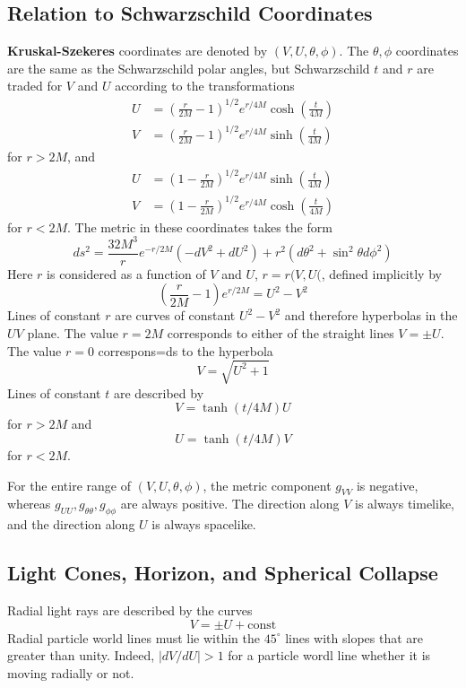 \subsection{Relation to Schwarzschild Coordinates}

\textbf{Kruskal-Szekeres} coordinates are denoted by $(V,U,\theta,\phi)$. The $\theta,\phi$ coordinates are the same as the Schwarzschild polar angles, but Schwarzschild $t$ and $r$ are traded for $V$ and $U$ according to the transformations \begin{align*}
    U &= \left(\frac{r}{2M}-1\right)^{1/2}e^{r/4M}\cosh\left(\frac{t}{4M}\right) \\
    V &= \left(\frac{r}{2M}-1\right)^{1/2}e^{r/4M}\sinh\left(\frac{t}{4M}\right)
\end{align*}
for $r > 2M$, and \begin{align*}
    U &= \left(1-\frac{r}{2M}\right)^{1/2}e^{r/4M}\sinh\left(\frac{t}{4M}\right) \\
    V &= \left(1-\frac{r}{2M}\right)^{1/2}e^{r/4M}\cosh\left(\frac{t}{4M}\right)
\end{align*}
for $r < 2M$. The metric in these coordinates takes the form \begin{equation*}
    \boxed{ds^2 = \frac{32M^3}{r}e^{-r/2M}\left(-dV^2+dU^2\right)+r^2\left(d\theta^2+\sin^2\theta d\phi^2\right)}
\end{equation*}
Here $r$ is considered as a function of $V$ and $U$, $r = r(V,U($, defined implicitly by $$\left(\frac{r}{2M}-1\right)e^{r/2M} = U^2-V^2$$
Lines of constant $r$ are curves of constant $U^2-V^2$ and therefore hyperbolas in the $UV$ plane. The value $r = 2M$ corresponds to either of the straight lines $V = \pm U$. The value $r = 0$ correspons=ds to the hyperbola $$V = \sqrt{U^2+1}$$
Lines of constant $t$ are described by $$V = \tanh(t/4M)U$$ 
for $r > 2M$ and $$U = \tanh(t/4M)V$$
for $r < 2M$.

For the entire range of $(V,U,\theta,\phi)$, the metric component $g_{VV}$ is negative, whereas $g_{UU}, g_{\theta\theta},g_{\phi\phi}$ are always positive. The direction along $V$ is always timelike, and the direction along $U$ is always spacelike.              

\subsection{Light Cones, Horizon, and Spherical Collapse}

Radial light rays are described by the curves $$V = \pm U+\text{const}$$
Radial particle world lines must lie within the $45^{\circ}$ lines with slopes that are greater than unity. Indeed, $|dV/dU| > 1$ for a particle wordl line whether it is moving radially or not.



